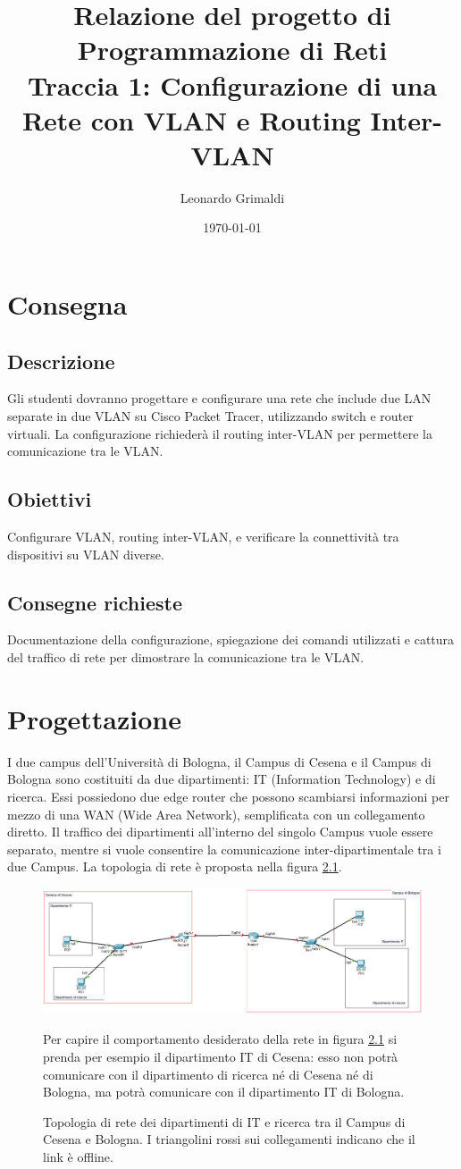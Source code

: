 \documentclass[a4paper,12pt]{report}
\title{Relazione del progetto di Programmazione di Reti 
    \\ Traccia 1: Configurazione di una Rete con VLAN e Routing Inter-VLAN}
\author{Leonardo Grimaldi}
\date{\today}
\begin{document}
\maketitle
\tableofcontents
\chapter{Consegna}
\section{Descrizione}
Gli studenti dovranno progettare e configurare una rete che include due LAN separate in due VLAN su Cisco Packet Tracer, utilizzando switch e router virtuali. La configurazione richiederà il routing inter-VLAN per permettere la comunicazione tra le VLAN.
\section{Obiettivi}
Configurare VLAN, routing inter-VLAN, e verificare la connettività tra dispositivi su VLAN diverse.
\section{Consegne richieste}
Documentazione della configurazione, spiegazione dei comandi utilizzati e cattura del traffico di rete per dimostrare la comunicazione tra le VLAN.
\chapter{Progettazione}
\label{chap:progettazione}
I due campus dell'Università di Bologna, il Campus di Cesena e il Campus di Bologna sono costituiti da due dipartimenti: IT (Information Technology) e di ricerca.
%
Essi possiedono due edge router che possono scambiarsi informazioni per mezzo di una WAN (Wide Area Network), semplificata con un collegamento diretto.
%
Il traffico dei dipartimenti all'interno del singolo Campus vuole essere separato, mentre si vuole consentire la comunicazione inter-dipartimentale tra i due Campus.
%
La topologia di rete è proposta nella figura \ref{fig:topologia_offline}. 
\begin{figure}[H]
\includegraphics[width=\textwidth]{offline_topology_with_departments.png}
\caption{
    Topologia di rete dei dipartimenti di IT e ricerca tra il Campus di Cesena e Bologna.
    I triangolini rossi sui collegamenti indicano che il link è offline.
    }
\label{fig:topologia_offline}
Per capire il comportamento desiderato della rete in figura \ref{fig:topologia_offline} si prenda per esempio il dipartimento IT di Cesena: esso non potrà comunicare con il dipartimento di ricerca né di Cesena né di Bologna, ma potrà comunicare con il dipartimento IT di Bologna.
\end{figure}
\end{document}
